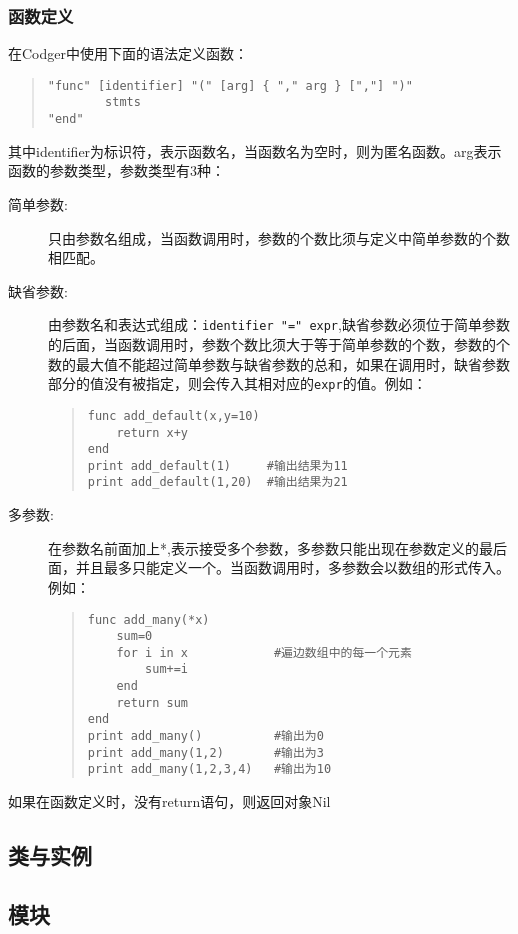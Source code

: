 \documentclass[a4paper,10pt]{article}
\begin{document}
\begin{CJK}{UTF8}{gbsn}
\subsubsection{函数定义}
在Codger中使用下面的语法定义函数：
\begin{quote}
\begin{verbatim}
"func" [identifier] "(" [arg] { "," arg } [","] ")"
        stmts
"end"
\end{verbatim}
\end{quote}
其中identifier为标识符，表示函数名，当函数名为空时，则为匿名函数。arg表示函数的参数类型，参数类型有3种：
\begin{description}
\item[简单参数:]只由参数名组成，当函数调用时，参数的个数比须与定义中简单参数的个数相匹配。
\item[缺省参数:]由参数名和表达式组成：\verb|identifier "=" expr|,缺省参数必须位于简单参数的后面，当函数调用时，参数个数比须大于等于简单参数的个数，参数的个数的最大值不能超过简单参数与缺省参数的总和，如果在调用时，缺省参数部分的值没有被指定，则会传入其相对应的\verb|expr|的值。例如：
\begin{quote}
\begin{verbatim}
func add_default(x,y=10)
    return x+y
end 
print add_default(1)     #输出结果为11
print add_default(1,20)  #输出结果为21
\end{verbatim}
\end{quote}
\item[多参数:]在参数名前面加上*,表示接受多个参数，多参数只能出现在参数定义的最后面，并且最多只能定义一个。当函数调用时，多参数会以数组的形式传入。例如：
\begin{quote}
\begin{verbatim}
func add_many(*x)
    sum=0
    for i in x            #遍边数组中的每一个元素
        sum+=i
    end
    return sum
end
print add_many()          #输出为0
print add_many(1,2)       #输出为3
print add_many(1,2,3,4)   #输出为10
\end{verbatim}
\end{quote}
\end{description}
如果在函数定义时，没有return语句，则返回对象Nil
\subsection{类与实例}
\subsection{模块} 








\end{CJK}
\end{document}
